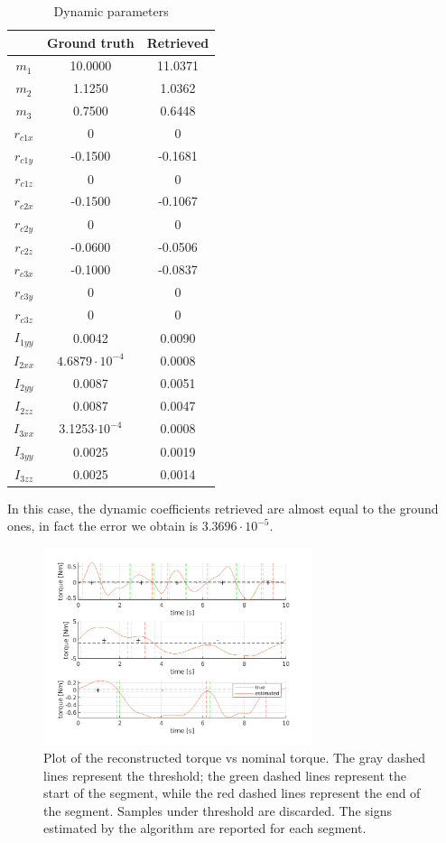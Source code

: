 \documentclass{article}
\begin{document}
\begin{table}[!htbp]
\centering
\begin{tabular}{|c|cc|}
\hline
& Ground truth & Retrieved\\ 
\hline
$m_1$ & 10.0000 & 11.0371\\
$m_2$ & 1.1250 & 1.0362\\
$m_3$ & 0.7500 & 0.6448\\
$r_{c1x}$ &  0 & 0\\
$r_{c1y}$ & -0.1500 & -0.1681\\
$r_{c1z}$ & 0 & 0\\
$r_{c2x}$ & -0.1500 & -0.1067\\
$r_{c2y}$ & 0 & 0\\
$r_{c2z}$ & -0.0600 & -0.0506\\
$r_{c3x}$ & -0.1000 & -0.0837\\
$r_{c3y}$ & 0 & 0\\
$r_{c3z}$ & 0 & 0\\
$I_{1yy}$ & 0.0042 & 0.0090\\
$I_{2xx}$ & $4.6879\cdot 10^{-4}$ & 0.0008\\
$I_{2yy}$ & 0.0087 & 0.0051\\
$I_{2zz}$ & 0.0087 & 0.0047\\
$I_{3xx}$ & 3.1253$\cdot 10^{-4}$ & 0.0008\\
$I_{3yy}$ & 0.0025 & 0.0019\\
$I_{3zz}$ & 0.0025 & 0.0014\\
\hline
\end{tabular}
\caption{Dynamic parameters}
\end{table}
\FloatBarrier

In this case, the dynamic coefficients retrieved are almost equal to the ground ones, in fact the error we obtain is  $3.3696\cdot10^{-5}$.

\begin{figure}[!htbp]
\centering
\includegraphics[width=0.7\textwidth]{images/3-dof/results2.png}
\caption{Plot of the reconstructed torque vs nominal torque. The gray dashed lines represent the threshold; the green dashed lines represent the start of the segment, while the red dashed lines represent the end of the segment. Samples under threshold are discarded. The signs estimated by the algorithm are reported for each segment.}
\end{figure}
\FloatBarrier
\end{document}
